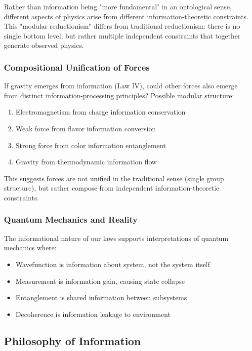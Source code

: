 \documentclass[11pt,a4paper]{article}
\theoremstyle{plain}
\theoremstyle{definition}
\theoremstyle{remark}
\begin{document}
Rather than information being "more fundamental" in an ontological sense, different aspects of physics arise from different information-theoretic constraints. This "modular reductionism" differs from traditional reductionism: there is no single bottom level, but rather multiple independent constraints that together generate observed physics.

\subsubsection{Compositional Unification of Forces}

If gravity emerges from information (Law IV), could other forces also emerge from distinct information-processing principles? Possible modular structure:

\begin{enumerate}[leftmargin=*]
\item Electromagnetism from charge information conservation
\item Weak force from flavor information conversion
\item Strong force from color information entanglement
\item Gravity from thermodynamic information flow
\end{enumerate}

This suggests forces are not unified in the traditional sense (single group structure), but rather compose from independent information-theoretic constraints.

\subsubsection{Quantum Mechanics and Reality}

The informational nature of our laws supports interpretations of quantum mechanics where:

\begin{itemize}[leftmargin=*]
\item Wavefunction is information about system, not the system itself
\item Measurement is information gain, causing state collapse
\item Entanglement is shared information between subsystems
\item Decoherence is information leakage to environment
\end{itemize}

\subsection{Philosophy of Information}
\end{document}
